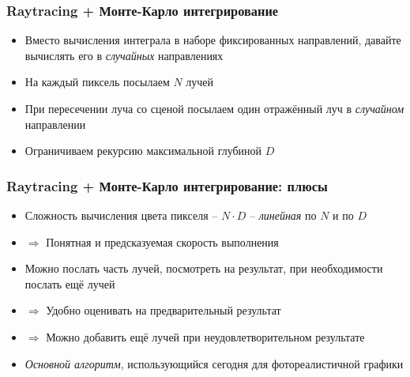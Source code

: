 \documentclass[10pt]{beamer}
\begin{document}
\begin{frame}[fragile]
\frametitle{Raytracing + Монте-Карло интегрирование}
\begin{itemize}
\item Вместо вычисления интеграла в наборе фиксированных направлений, давайте вычислять его в \textit{случайных} направлениях
\pause
\item На каждый пиксель посылаем \begin{math}N\end{math} лучей
\pause
\item При пересечении луча со сценой посылаем один отражённый луч в \textit{случайном} направлении
\pause
\item Ограничиваем рекурсию максимальной глубиной \begin{math}D\end{math}
\end{itemize}
\end{frame}

\begin{frame}[fragile]
\frametitle{Raytracing + Монте-Карло интегрирование: плюсы}
\begin{itemize}
\item Сложность вычисления цвета пикселя -- \begin{math}N\cdot D\end{math} -- \textit{линейная} по \begin{math}N\end{math} и по \begin{math}D\end{math}
\pause
\item \begin{math}\Longrightarrow\end{math} Понятная и предсказуемая скорость выполнения
\pause
\item Можно послать часть лучей, посмотреть на результат, при необходимости послать ещё лучей
\pause
\item \begin{math}\Longrightarrow\end{math} Удобно оценивать на предварительный результат
\pause
\item \begin{math}\Longrightarrow\end{math} Можно добавить ещё лучей при неудовлетворительном результате
\pause
\item \textit{Основной алгоритм}, использующийся сегодня для фотореалистичной графики
\end{itemize}
\end{frame}
\end{document}
